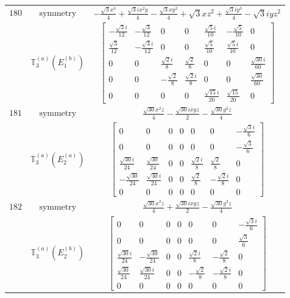 \documentclass[fleqn,8pt,landscape]{jsarticle}
\begin{document}
\begin{longtable}{ccc}
$ 180 $ & $ \text{symmetry} $ & $ - \frac{\sqrt{3} x^{3}}{4} + \frac{\sqrt{3} i x^{2} y}{4} - \frac{\sqrt{3} x y^{2}}{4} + \sqrt{3} x z^{2} + \frac{\sqrt{3} i y^{3}}{4} - \sqrt{3} i y z^{2} $ \\
$  $ & $ \mathbb{T}_{3}^{(a)}(E_{1}^{(b)}) $ & $ \begin{bmatrix} - \frac{\sqrt{3} i}{12} & - \frac{\sqrt{3}}{12} & 0 & 0 & \frac{\sqrt{5} i}{10} & - \frac{\sqrt{5}}{10} & 0 \\ \frac{\sqrt{3}}{12} & - \frac{\sqrt{3} i}{12} & 0 & 0 & \frac{\sqrt{5}}{10} & \frac{\sqrt{5} i}{10} & 0 \\ 0 & 0 & \frac{\sqrt{2} i}{8} & \frac{\sqrt{2}}{8} & 0 & 0 & \frac{\sqrt{30} i}{60} \\ 0 & 0 & - \frac{\sqrt{2}}{8} & \frac{\sqrt{2} i}{8} & 0 & 0 & \frac{\sqrt{30}}{60} \\ 0 & 0 & 0 & 0 & \frac{\sqrt{15} i}{20} & \frac{\sqrt{15}}{20} & 0 \end{bmatrix} $ \\ \hline
$ 181 $ & $ \text{symmetry} $ & $ \frac{\sqrt{30} x^{2} z}{4} - \frac{\sqrt{30} i x y z}{2} - \frac{\sqrt{30} y^{2} z}{4} $ \\
$  $ & $ \mathbb{T}_{3}^{(a)}(E_{2}^{(a)}) $ & $ \begin{bmatrix} 0 & 0 & 0 & 0 & 0 & 0 & - \frac{\sqrt{3} i}{6} \\ 0 & 0 & 0 & 0 & 0 & 0 & - \frac{\sqrt{3}}{6} \\ \frac{\sqrt{30} i}{24} & \frac{\sqrt{30}}{24} & 0 & 0 & \frac{\sqrt{2} i}{8} & \frac{\sqrt{2}}{8} & 0 \\ - \frac{\sqrt{30}}{24} & \frac{\sqrt{30} i}{24} & 0 & 0 & \frac{\sqrt{2}}{8} & - \frac{\sqrt{2} i}{8} & 0 \\ 0 & 0 & 0 & 0 & 0 & 0 & 0 \end{bmatrix} $ \\ \hline
$ 182 $ & $ \text{symmetry} $ & $ \frac{\sqrt{30} x^{2} z}{4} + \frac{\sqrt{30} i x y z}{2} - \frac{\sqrt{30} y^{2} z}{4} $ \\
$  $ & $ \mathbb{T}_{3}^{(a)}(E_{2}^{(b)}) $ & $ \begin{bmatrix} 0 & 0 & 0 & 0 & 0 & 0 & - \frac{\sqrt{3} i}{6} \\ 0 & 0 & 0 & 0 & 0 & 0 & \frac{\sqrt{3}}{6} \\ \frac{\sqrt{30} i}{24} & - \frac{\sqrt{30}}{24} & 0 & 0 & \frac{\sqrt{2} i}{8} & - \frac{\sqrt{2}}{8} & 0 \\ \frac{\sqrt{30}}{24} & \frac{\sqrt{30} i}{24} & 0 & 0 & - \frac{\sqrt{2}}{8} & - \frac{\sqrt{2} i}{8} & 0 \\ 0 & 0 & 0 & 0 & 0 & 0 & 0 \end{bmatrix} $ \\ \hline

\end{longtable}
\end{document}
